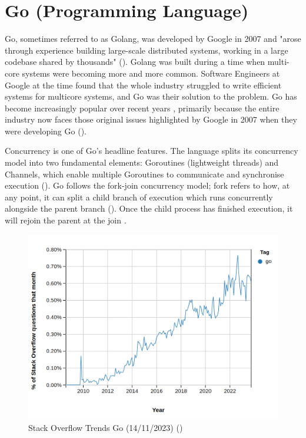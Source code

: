 \section{Go (Programming Language)}
\label{litrev:golang}

Go, sometimes referred to as Golang, was developed by Google in 2007 and "arose through experience building large-scale distributed systems, working in a large codebase shared by thousands" (\cite{cox_go_2022}). Golang was built during a time when multi-core systems were becoming more and more common. Software Engineers at Google at the time found that the whole industry struggled to write efficient systems for multicore systems, and Go was their solution to the problem. Go has become increasingly popular over recent years , primarily because the entire industry now faces those original issues highlighted by Google in 2007 when they were developing Go (\cite{cox_go_2022}).

Concurrency is one of Go's headline features. The language splits its concurrency model into two fundamental elements: Goroutines (lightweight threads) and Channels, which enable multiple Goroutines to communicate and synchronise execution (\cite{meyerson_go_2014}). Go follows the fork-join concurrency model; fork refers to how, at any point, it can split a child branch of execution which runs concurrently alongside the parent branch (\cite{cox-buday_concurrency_2017}). Once the child process has finished execution, it will rejoin the parent at the join .

\begin{figure}
    \centering
    \includegraphics[width=0.8\linewidth]{figures/go-so-graph.png}
    \caption{Stack Overflow Trends Go (14/11/2023) (\cite{noauthor_stack_nodate-1})}
    \label{fig:gosograph}
\end{figure}

